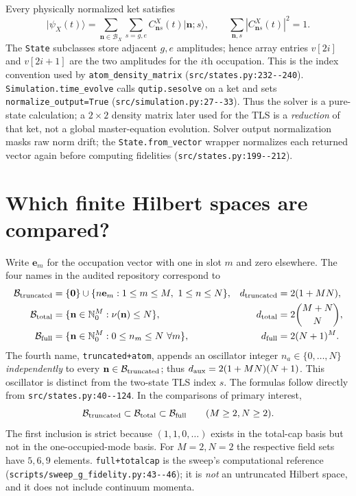 \documentclass[11pt,a4paper]{article}
\newcommand{\ket}[1]{\lvert #1\rangle}
\newcommand{\code}[1]{\nolinkurl{#1}}
\newcommand{\BB}{\mathcal B}
\begin{document}
Every physically normalized ket satisfies
\begin{equation}
 \ket{\psi_X(t)}=\sum_{\mathbf n\in\BB_X}\sum_{s=g,e}
 C^X_{\mathbf n s}(t)\ket{\mathbf n;s},\qquad
 \sum_{\mathbf n,s}|C^X_{\mathbf n s}(t)|^2=1.
 \label{eq:ket}
\end{equation}
The \code{State} subclasses store adjacent $g,e$ amplitudes; hence array entries $v[2i]$ and $v[2i+1]$ are the two amplitudes for the $i$th occupation. This is the index convention used by \code{atom_density_matrix} (\code{src/states.py:232--240}). \code{Simulation.time_evolve} calls \code{qutip.sesolve} on a ket and sets \code{normalize_output=True} (\code{src/simulation.py:27--33}). Thus the solver is a pure-state calculation; a $2\times2$ density matrix later used for the TLS is a \emph{reduction} of that ket, not a global master-equation evolution. Solver output normalization masks raw norm drift; the \code{State.from_vector} wrapper normalizes each returned vector again before computing fidelities (\code{src/states.py:199--212}).

\section{Which finite Hilbert spaces are compared?}
\label{sec:bases}
Write $\mathbf e_m$ for the occupation vector with one in slot $m$ and zero elsewhere. The four names in the audited repository correspond to
\begin{align}
\BB_{\rm truncated}&=\{\mathbf0\}\cup\{n\mathbf e_m:1\le m\le M,\ 1\le n\le N\},
 &d_{\rm truncated}&=2(1+MN),\label{eq:btr}\\
\BB_{\rm total}&=\{\mathbf n\in\mathbb N_0^M:\nu(\mathbf n)\le N\},
 &d_{\rm total}&=2\binom{M+N}{N},\label{eq:btot}\\
\BB_{\rm full}&=\{\mathbf n\in\mathbb N_0^M:0\le n_m\le N\ \forall m\},
 &d_{\rm full}&=2(N+1)^M.\label{eq:bfull}
\end{align}
The fourth name, \code{truncated+atom}, appends an oscillator integer $n_a\in\{0,\ldots,N\}$ \emph{independently} to every $\mathbf n\in\BB_{\rm truncated}$; thus $d_{\rm aux}=2(1+MN)(N+1)$. This oscillator is distinct from the two-state TLS index $s$. The formulas follow directly from \code{src/states.py:40--124}. In the comparisons of primary interest,
\begin{equation}
 \BB_{\rm truncated}\subset\BB_{\rm total}\subset\BB_{\rm full}
 \qquad(M\ge2,N\ge2).
 \label{eq:nesting}
\end{equation}
The first inclusion is strict because $(1,1,0,\ldots)$ exists in the total-cap basis but not in the one-occupied-mode basis. For $M=2,N=2$ the respective field sets have $5,6,9$ elements. \code{full+totalcap} is the sweep's computational reference (\code{scripts/sweep_g_fidelity.py:43--46}); it is \emph{not} an untruncated Hilbert space, and it does not include continuum momenta.
\end{document}
